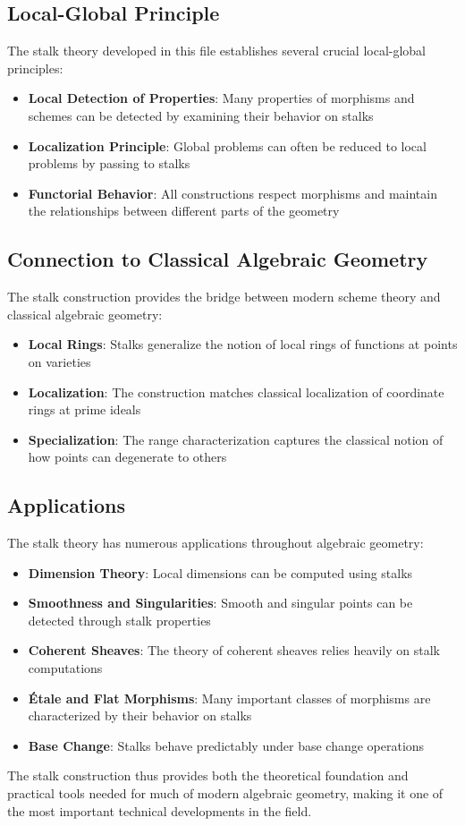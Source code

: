 \documentclass{article}
\theoremstyle{definition}
\begin{document}
\subsection{Local-Global Principle}

The stalk theory developed in this file establishes several crucial local-global principles:

\begin{itemize}
\item \textbf{Local Detection of Properties}: Many properties of morphisms and schemes can be detected by examining their behavior on stalks
\item \textbf{Localization Principle}: Global problems can often be reduced to local problems by passing to stalks
\item \textbf{Functorial Behavior}: All constructions respect morphisms and maintain the relationships between different parts of the geometry
\end{itemize}

\subsection{Connection to Classical Algebraic Geometry}

The stalk construction provides the bridge between modern scheme theory and classical algebraic geometry:

\begin{itemize}
\item \textbf{Local Rings}: Stalks generalize the notion of local rings of functions at points on varieties
\item \textbf{Localization}: The construction matches classical localization of coordinate rings at prime ideals
\item \textbf{Specialization}: The range characterization captures the classical notion of how points can degenerate to others
\end{itemize}

\subsection{Applications}

The stalk theory has numerous applications throughout algebraic geometry:

\begin{itemize}
\item \textbf{Dimension Theory}: Local dimensions can be computed using stalks
\item \textbf{Smoothness and Singularities}: Smooth and singular points can be detected through stalk properties
\item \textbf{Coherent Sheaves}: The theory of coherent sheaves relies heavily on stalk computations
\item \textbf{Étale and Flat Morphisms}: Many important classes of morphisms are characterized by their behavior on stalks
\item \textbf{Base Change}: Stalks behave predictably under base change operations
\end{itemize}

The stalk construction thus provides both the theoretical foundation and practical tools needed for much of modern algebraic geometry, making it one of the most important technical developments in the field.
\end{document}
